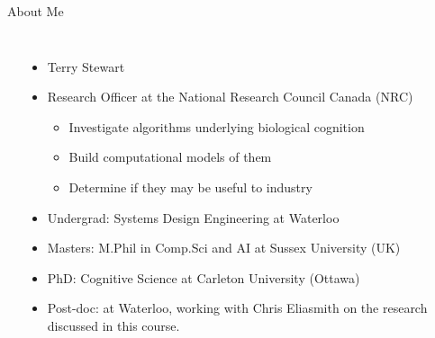 \documentclass[aspectratio=169]{beamer}
\begin{document}
\begin{frame}{About Me}
	\begin{columns}[T]
		\fboxrule=0.4pt\fboxsep=0pt\\
		\begin{itemize}
			\item Terry Stewart
			\item Research Officer at the National Research Council Canada (NRC)
			\begin{itemize}
				\item Investigate algorithms underlying biological cognition
				\item Build computational models of them
				\item Determine if they may be useful to industry
			\end{itemize}
			\item Undergrad: Systems Design Engineering at Waterloo
			\item Masters: M.Phil in Comp.Sci and AI at Sussex University (UK)
			\item PhD: Cognitive Science at Carleton University (Ottawa)
			\item Post-doc: at Waterloo, working with Chris Eliasmith on the research discussed in this course.
		\end{itemize}
	\end{columns}
\end{frame}
\end{document}

